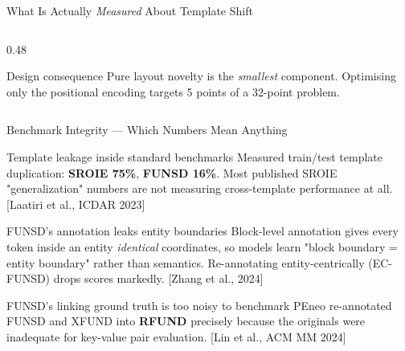 \documentclass[aspectratio=169, 11pt]{beamer}
\newcommand{\srcnote}[1]{{\scriptsize\color{muted}[#1]}}
\newcommand{\gap}[1]{{\color{warn}\textbf{#1}}}
\begin{document}
\begin{frame}{What Is Actually \emph{Measured} About Template Shift}
\begin{columns}[T]
\begin{column}{0.48\textwidth}
      \begin{alertblock}{\footnotesize Design consequence}
        \scriptsize Pure layout novelty is the \emph{smallest} component. Optimising only the
        positional encoding targets 5 points of a 32-point problem.
      \end{alertblock}
    \end{column}
  \end{columns}
\end{frame}

\begin{frame}{Benchmark Integrity — Which Numbers Mean Anything}
  \small
  \begin{block}{Template leakage inside standard benchmarks}
    Measured train/test template duplication: \textbf{SROIE \gap{75\%}}, \textbf{FUNSD 16\%}.
    Most published SROIE "generalization" numbers are not measuring cross-template
    performance at all. \srcnote{Laatiri et al., ICDAR 2023}
  \end{block}

  \begin{block}{FUNSD's annotation leaks entity boundaries}
    Block-level annotation gives every token inside an entity \emph{identical} coordinates, so
    models learn "block boundary = entity boundary" rather than semantics. Re-annotating
    entity-centrically (EC-FUNSD) drops scores markedly. \srcnote{Zhang et al., 2024}
  \end{block}

  \begin{block}{FUNSD's linking ground truth is too noisy to benchmark}
    PEneo re-annotated FUNSD and XFUND into \textbf{RFUND} precisely because the originals
    were inadequate for key-value pair evaluation. \srcnote{Lin et al., ACM MM 2024}
  \end{block}

  \medskip
\end{frame}
\end{document}
